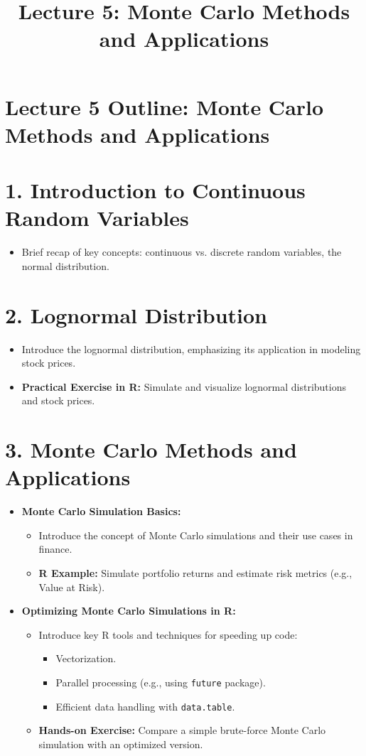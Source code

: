 \documentclass[12pt]{article}
\title{Lecture 5: Monte Carlo Methods and Applications}
\author{}
\date{}
\begin{document}
	
	\maketitle
	
	\section*{Lecture 5 Outline: Monte Carlo Methods and Applications}
	
	\section*{1. Introduction to Continuous Random Variables}
	\begin{itemize}
		\item Brief recap of key concepts: continuous vs. discrete random variables, the normal distribution.
	\end{itemize}
	
	\section*{2. Lognormal Distribution}
	\begin{itemize}
		\item Introduce the lognormal distribution, emphasizing its application in modeling stock prices.
		\item \textbf{Practical Exercise in R:} Simulate and visualize lognormal distributions and stock prices.
	\end{itemize}
	
	\section*{3. Monte Carlo Methods and Applications}
	\begin{itemize}
		\item \textbf{Monte Carlo Simulation Basics:}
		\begin{itemize}
			\item Introduce the concept of Monte Carlo simulations and their use cases in finance.
			\item \textbf{R Example:} Simulate portfolio returns and estimate risk metrics (e.g., Value at Risk).
		\end{itemize}
		\item \textbf{Optimizing Monte Carlo Simulations in R:}
		\begin{itemize}
			\item Introduce key R tools and techniques for speeding up code:
			\begin{itemize}
				\item Vectorization.
				\item Parallel processing (e.g., using \texttt{future} package).
				\item Efficient data handling with \texttt{data.table}.
			\end{itemize}
			\item \textbf{Hands-on Exercise:} Compare a simple brute-force Monte Carlo simulation with an optimized version.
		\end{itemize}
	\end{itemize}
	
\end{document}
